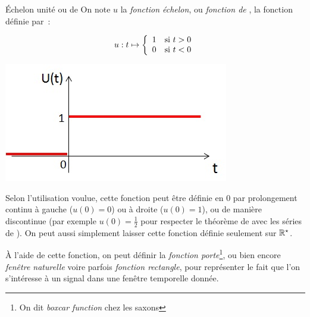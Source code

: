 \begin{remark}{}
\begin{definition}{Échelon unité ou de \Heaviside{}}
          On note $u$ la \emph{fonction échelon}, ou \emph{fonction de
            \Heaviside{}}, la fonction définie par~:\newline
	\begin{minipage}[l]{0.4\linewidth}
          \begin{equation}
          \label{eq:heaviside}
          u : t \mapsto \left \{
            \begin{array}{l l}
              1  & \text{si }t>0 \\
              0   & \text{si }t<0 
            \end{array}
          \right .	 	
	\end{equation}
	\end{minipage}\hfill
	\begin{minipage}[r]{0.55\textwidth}
          \includegraphics[width=0.9\linewidth]{images/Heaviside.jpg}
	\end{minipage}
      \end{definition}
      \begin{remarque}
        Selon l'utilisation voulue, cette fonction peut être définie
        en 0 par prolongement continu à gauche ($u(0)=0$) ou à droite
        ($u(0)=1$), ou de manière discontinue (par exemple
        $u(0)=\frac{1}{2}$ pour respecter le théorème de \Dirichlet{}
        avec les séries de \Fourier{}). On peut aussi simplement laisser
        cette fonction définie seulement sur $\mathbb{R}^{\star}$.
      \end{remarque}
        
      À l'aide de cette fonction, on peut définir la \emph{fonction
        porte}\footnote{On dit \emph{boxcar function} chez les saxons}, ou bien
      encore \emph{fenêtre naturelle} voire parfois \emph{fonction
        rectangle}, pour représenter le fait que l'on s'intéresse à un
      signal dans une fenêtre temporelle donnée.
        

\end{remark}
